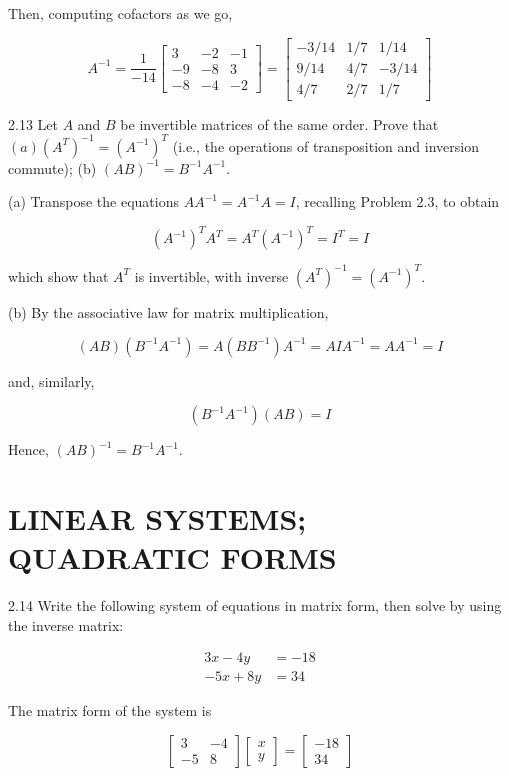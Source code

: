 \documentclass[10pt]{article}
\begin{document}
Then, computing cofactors as we go,

$$
A^{-1}=\frac{1}{-14}\left[\begin{array}{rrr}
3 & -2 & -1 \\
-9 & -8 & 3 \\
-8 & -4 & -2
\end{array}\right]=\left[\begin{array}{rrr}
-3 / 14 & 1 / 7 & 1 / 14 \\
9 / 14 & 4 / 7 & -3 / 14 \\
4 / 7 & 2 / 7 & 1 / 7
\end{array}\right]
$$

2.13 Let $A$ and $B$ be invertible matrices of the same order. Prove that $(a)\left(A^{T}\right)^{-1}=\left(A^{-1}\right)^{T}$ (i.e., the operations of transposition and inversion commute); (b) $(A B)^{-1}=B^{-1} A^{-1}$.

(a) Transpose the equations $A A^{-1}=A^{-1} A=I$, recalling Problem 2.3, to obtain

$$
\left(A^{-1}\right)^{T} A^{T}=A^{T}\left(A^{-1}\right)^{T}=I^{T}=I
$$

which show that $A^{T}$ is invertible, with inverse $\left(A^{T}\right)^{-1}=\left(A^{-1}\right)^{T}$.

(b) By the associative law for matrix multiplication,

$$
(A B)\left(B^{-1} A^{-1}\right)=A\left(B B^{-1}\right) A^{-1}=A I A^{-1}=A A^{-1}=I
$$

and, similarly,

$$
\left(B^{-1} A^{-1}\right)(A B)=I
$$

Hence, $(A B)^{-1}=B^{-1} A^{-1}$.

\section*{LINEAR SYSTEMS; QUADRATIC FORMS}
2.14 Write the following system of equations in matrix form, then solve by using the inverse matrix:

$$
\begin{aligned}
3 x-4 y & =-18 \\
-5 x+8 y & =34
\end{aligned}
$$

The matrix form of the system is

\[
\left[\begin{array}{rr}
3 & -4  \tag{1}\\
-5 & 8
\end{array}\right]\left[\begin{array}{l}
x \\
y
\end{array}\right]=\left[\begin{array}{r}
-18 \\
34
\end{array}\right]
\]
\end{document}
